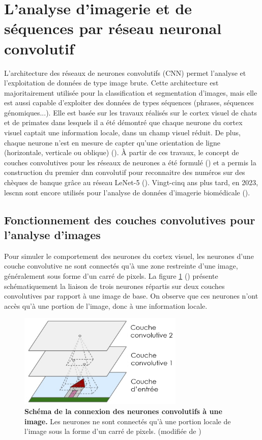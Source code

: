 \section{L'analyse d'imagerie et de séquences par réseau neuronal convolutif}
L'architecture des réseaux de neurones convolutifs (CNN) permet l'analyse et l'exploitation de données de type image brute. Cette architecture est majoritairement utilisée pour la classification et segmentation d'images, mais elle est aussi capable d'exploiter des données de types séquences (phrases, séquences génomiques...). Elle est basée sur les travaux réalisés sur le cortex visuel de chats et de primates dans lesquels il a été démontré que chaque neurone du cortex visuel captait une information locale, dans un champ visuel réduit. De plus, chaque neurone n'est en mesure de capter qu'une orientation de ligne (horizontale, verticale ou oblique) (\cite{hubel_receptive_1959, hubel_single_1959}). À partir de ces travaux, le concept de couches convolutives pour les réseaux de neurones a été formulé (\cite{fukushima_neocognitron_1980}) et a permis la construction du premier \gls{dnn} convolutif pour reconnaitre des numéros sur des chèques de banque grâce au réseau LeNet-5 (\cite{lecun_gradient-based_1998}). Vingt-cinq ans plus tard, en 2023, les\gls{cnn} sont encore utilisés pour l'analyse de données d'imagerie biomédicale (\cite{holscher_next-generation_2023, ker_automated_2019}).
 
\subsection{Fonctionnement des couches convolutives pour l'analyse d'images}
Pour simuler le comportement des neurones du cortex visuel, les neurones d'une couche convolutive ne sont connectés qu'à une zone restreinte d'une image, généralement sous forme d'un carré de pixels. La figure \ref{fig:conv_simple} (\cite{aurelien_geron_hands-machine_2019}) présente schématiquement la liaison de trois neurones répartis sur deux couches convolutives par rapport à une image de base. On observe que ces neurones n'ont accès qu'à une portion de l'image, donc à une information locale. 
\begin{figure}[!ht]
 \centering
 \includegraphics[width=0.7\textwidth]{figures/conv_simple.png}
 \caption[Schéma de la connection des neurones convolutifs à une image]{\textbf{Schéma de la connexion des neurones convolutifs à une image.} Les neurones ne sont connectés qu'à une portion locale de l'image sous la forme d'un carré de pixels. (modifiée de \cite{aurelien_geron_hands-machine_2019})}
 \label{fig:conv_simple}
\end{figure}


